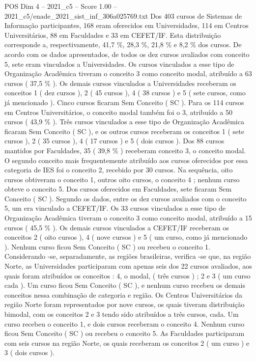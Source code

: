 \begin{textsample}{POS Dim 4 – 2021\_c5 – Score 1.00 – 2021\_c5/enade\_2021\_sist\_inf\_306a025769.txt}
Dos 403 cursos de Sistemas de Informação participantes, 168 eram oferecidos em Universidades, 114 em Centros Universitários, 88 em Faculdades e 33 em CEFET/IF.
Esta distribuição corresponde a, respectivamente, 41,7 \%, 28,3 \%, 21,8 \% e 8,2 \% dos cursos.
De acordo com os dados apresentados, de todos os dez cursos avaliados com conceito 5, sete eram vinculados a Universidades.
Os cursos vinculados a esse tipo de Organização Acadêmica tiveram o conceito 3 como conceito modal, atribuído a 63 cursos ( 37,5 \% ).
Os demais cursos vinculados a Universidades receberam os conceitos 1 ( dez cursos ), 2 ( 45 cursos ), 4 ( 38 cursos ) e 5 ( sete cursos, como já mencionado ).
Cinco cursos ficaram Sem Conceito ( SC ).
Para os 114 cursos em Centros Universitários, o conceito modal também foi o 3, atribuído a 50 cursos ( 43,9 \% ).
Três cursos vinculados a esse tipo de Organização Acadêmica ficaram Sem Conceito ( SC ), e os outros cursos receberam os conceitos 1 ( sete cursos ), 2 ( 35 cursos ), 4 ( 17 cursos ) e 5 ( dois cursos ).
Dos 88 cursos mantidos por Faculdades, 35 ( 39,8 \% ) receberam conceito 3, o conceito modal.
O segundo conceito mais frequentemente atribuído aos cursos oferecidos por essa categoria de IES foi o conceito 2, recebido por 30 cursos.
Na sequência, oito cursos obtiveram o conceito 1, outros oito cursos, o conceito 4 ; nenhum curso obteve o conceito 5.
Dos cursos oferecidos em Faculdades, sete ficaram Sem Conceito ( SC ).
Segundo os dados, entre os dez cursos avaliados com o conceito 5, um era vinculado a CEFET/IF.
Os 33 cursos vinculados a esse tipo de Organização Acadêmica tiveram o conceito 3 como conceito modal, atribuído a 15 cursos ( 45,5 \% ).
Os demais cursos vinculados a CEFET/IF receberam os conceitos 2 ( oito cursos ), 4 ( nove cursos ) e 5 ( um curso, como já mencionado ).
Nenhum curso ficou Sem Conceito ( SC ) ou recebeu o conceito 1.
Considerando -se, separadamente, as regiões brasileiras, verifica -se que, na região Norte, as Universidades participaram com apenas seis dos 22 cursos avaliados, aos quais foram atribuídos os conceitos : 4, o modal, ( três cursos ) ; 2 e 3 ( um curso cada ).
Um curso ficou Sem Conceito ( SC ), e nenhum curso recebeu os demais conceitos nessa combinação de categoria e região.
Os Centros Universitários da região Norte foram representados por nove cursos, os quais tiveram distribuição bimodal, com os conceitos 2 e 3 tendo sido atribuídos a três cursos, cada.
Um curso recebeu o conceito 1, e dois cursos receberam o conceito 4.
Nenhum curso ficou Sem Conceito ( SC ) ou recebeu o conceito 5.
As Faculdades participaram com seis cursos na região Norte, os quais receberam os conceitos 2 ( um curso ) e 3 ( dois cursos ).

\end{textsample}
